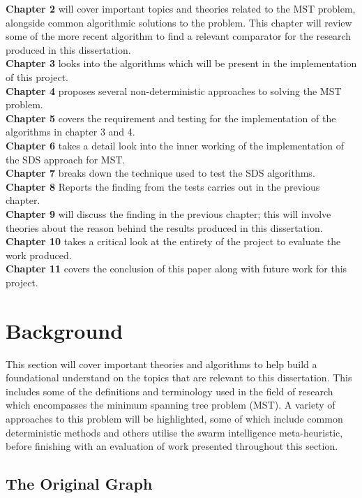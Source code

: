 \documentclass{AISB2008}
\begin{document}
\textbf{Chapter 2} will cover important topics and theories related to the MST problem, alongside common algorithmic solutions to the problem. This chapter will review some of the more recent algorithm to find a relevant comparator for the research produced in this dissertation.\\
\textbf{Chapter 3} looks into the algorithms which will be present in the implementation of this project.\\
\textbf{Chapter 4} proposes several non-deterministic approaches to solving the MST problem.\\
\textbf{Chapter 5} covers the requirement and testing for the implementation of the algorithms in chapter 3 and 4.\\
\textbf{Chapter 6} takes a detail look into the inner working of the implementation of the SDS approach for MST.\\
\textbf{Chapter 7} breaks down the technique used to test the SDS algorithms.\\
\textbf{Chapter 8} Reports the finding from the tests carries out in the previous chapter.\\
\textbf{Chapter 9} will discuss the finding in the previous chapter; this will involve theories about the reason behind the results produced in this dissertation.\\
\textbf{Chapter 10} takes a critical look at the entirety of the project to evaluate the work produced.\\
\textbf{Chapter 11} covers the conclusion of this paper along with future work for this project.\\



\section{Background}

This section will cover important theories and algorithms to help build a foundational understand on the topics that are relevant to this dissertation. This includes some of the definitions and terminology used in the field of research which encompasses the minimum spanning tree problem (MST). A variety of approaches to this problem will be highlighted, some of which include common deterministic methods and others utilise the swarm intelligence meta-heuristic, before finishing with an evaluation of work presented throughout this section.


\subsection{The Original Graph}
\end{document}

